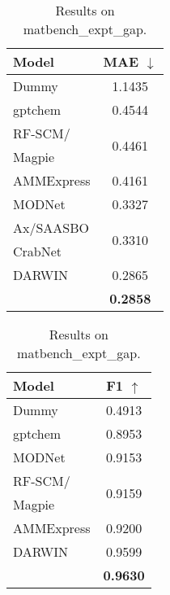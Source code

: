 \begin{table}[h]
  \centering
  \begin{minipage}{0.3\linewidth}
    \centering
    \begin{tabular}{lc}
    \toprule
    Model &  MAE $\downarrow$ \\
    \midrule
    Dummy\cite{matbench} & 1.1435\\
    gptchem\cite{Jablonka_2023} & 0.4544\\
    RF-SCM/ & \multirow{2}{*}{0.4461}\\
    Magpie\cite{matbench} & \\
    AMMExpress\cite{matbench} & 0.4161\\
    MODNet\cite{De_Breuck_2021} & 0.3327\\
    Ax/SAASBO & \multirow{2}{*}{0.3310} \\
     CrabNet\cite{Wang2021crabnet,erikssonHighDimensionalBayesianOptimization2021} & \\
    DARWIN\cite{xie2023darwin} & 0.2865 \\
    \midrule
    \ourM{} & \textbf{0.2858} \\
    \bottomrule
    \end{tabular}  
    \vspace{0.35cm} %
    \caption{Results on matbench\_expt\_gap.}
    \label{tab:pi-matbench-expt-gap}
  \end{minipage}
  \hfill  
  \begin{minipage}{0.3\linewidth}
    \centering
    \begin{tabular}{lc}
    \toprule
    Model &  F1 $\uparrow$ \\
    \midrule
    Dummy\cite{matbench} & 0.4913\\
    gptchem\cite{Jablonka_2023} & 0.8953\\
    MODNet\cite{De_Breuck_2021} & 0.9153\\
    RF-SCM/ & \multirow{2}{*}{0.9159}\\
    Magpie\cite{matbench} & \\
    AMMExpress\cite{matbench} & 0.9200\\
    DARWIN\cite{xie2023darwin} & 0.9599 \\
    \midrule
    \ourM{} & \textbf{0.9630} \\

\end{tabular}
\end{minipage}
\end{table}
